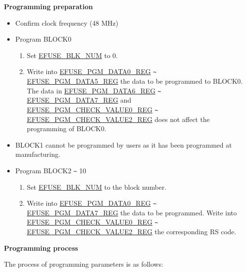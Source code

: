 \documentclass[main\_\_EN.tex]{subfiles}
\begin{document}
{\bfseries Programming preparation}

\begin{itemize}
    \item Confirm clock frequency (48 MHz)
    \item Program BLOCK0
    \begin{enumerate}
        \item Set \hyperref[fielddesc:EFUSEBLKNUM]{EFUSE\_BLK\_NUM} to 0.
        \item Write into \hyperref[regdesc:EFUSEPGMDATANREG]{EFUSE\_PGM\_DATA0\_REG} \verb+~+ \hyperref[regdesc:EFUSEPGMDATANREG]{EFUSE\_PGM\_DATA5\_REG} the data to be programmed to BLOCK0. \\
        The data in \hyperref[regdesc:EFUSEPGMDATANREG]{EFUSE\_PGM\_DATA6\_REG} \verb+~+ \hyperref[regdesc:EFUSEPGMDATANREG]{EFUSE\_PGM\_DATA7\_REG} and \hyperref[regdesc:EFUSEPGMCHECKVALUENREG]{EFUSE\_PGM\_CHECK\_VALUE0\_REG} \verb+~+ \hyperref[regdesc:EFUSEPGMCHECKVALUENREG]{EFUSE\_PGM\_CHECK\_VALUE2\_REG} does not affect the programming of BLOCK0.
    \end{enumerate}
    \item BLOCK1 cannot be programmed by users as it has been programmed at manufacturing.
    \item Program BLOCK2 \verb+~+ 10
    \begin{enumerate}
        \item Set \hyperref[fielddesc:EFUSEBLKNUM]{EFUSE\_BLK\_NUM} to the block number.
        \item Write into \hyperref[regdesc:EFUSEPGMDATANREG]{EFUSE\_PGM\_DATA0\_REG} \verb+~+ \hyperref[regdesc:EFUSEPGMDATANREG]{EFUSE\_PGM\_DATA7\_REG} the data to be programmed. Write into \hyperref[regdesc:EFUSEPGMCHECKVALUENREG]{EFUSE\_PGM\_CHECK\_VALUE0\_REG}  \verb+~+ \hyperref[regdesc:EFUSEPGMCHECKVALUENREG]{EFUSE\_PGM\_CHECK\_VALUE2\_REG} the corresponding RS code.
    \end{enumerate}
\end{itemize}

{\bfseries Programming process}

The process of programming parameters is as follows:
\end{document}
